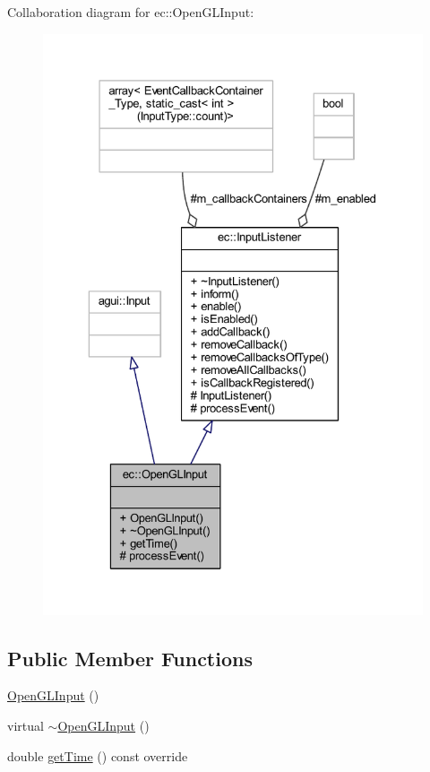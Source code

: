 Collaboration diagram for ec\+:\+:Open\+G\+L\+Input\+:\nopagebreak
\begin{figure}[H]
\begin{center}
\leavevmode
\includegraphics[width=329pt]{classec_1_1_open_g_l_input__coll__graph}
\end{center}
\end{figure}
\subsection*{Public Member Functions}
\begin{DoxyCompactItemize}
\item 
\mbox{\hyperlink{classec_1_1_open_g_l_input_a7046406475d576873c287a64ea4d3cb6}{Open\+G\+L\+Input}} ()
\item 
virtual \mbox{\hyperlink{classec_1_1_open_g_l_input_ab4a3fa6d2e349d8dbf4de8b50a7a81ae}{$\sim$\+Open\+G\+L\+Input}} ()
\item 
double \mbox{\hyperlink{classec_1_1_open_g_l_input_a5a4c1780a904c55d5ac38272234b87a7}{get\+Time}} () const override
\end{DoxyCompactItemize}
